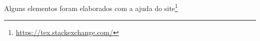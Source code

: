 \documentclass[article,11pt]{standalone}
\begin{document}
\sffamily\selectfont
	




Alguns elementos foram elaborados com a ajuda do site\footnote{\url{https://tex.stackexchange.com/}}
\end{document}
